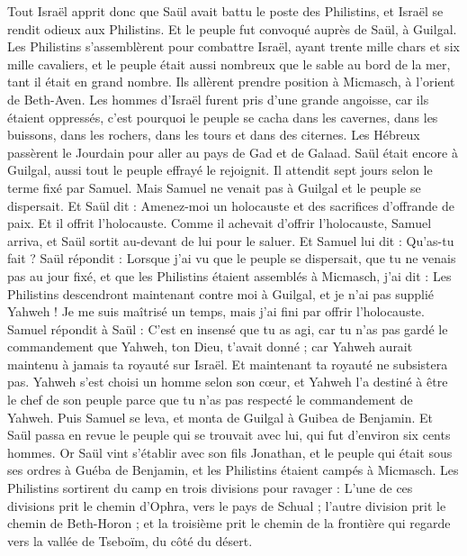 \begin{multicols}{2}
Tout Israël apprit donc que Saül avait battu le poste des Philistins, et Israël se rendit odieux aux Philistins. Et le peuple fut convoqué auprès de Saül, à Guilgal.
Les Philistins s'assemblèrent pour combattre Israël, ayant trente mille chars et six mille cavaliers, et le peuple était aussi nombreux que le sable au bord de la mer, tant il était en grand nombre. Ils allèrent prendre position à Micmasch, à l'orient de Beth-Aven.
Les hommes d'Israël furent pris d'une grande angoisse, car ils étaient oppressés, c'est pourquoi le peuple se cacha dans les cavernes, dans les buissons, dans les rochers, dans les tours et dans des citernes.
Les Hébreux passèrent le Jourdain pour aller au pays de Gad et de Galaad. Saül était encore à Guilgal, aussi tout le peuple effrayé le rejoignit.
Il attendit sept jours selon le terme fixé par Samuel. Mais Samuel ne venait pas à Guilgal et le peuple se dispersait.
Et Saül dit : Amenez-moi un holocauste et des sacrifices d'offrande de paix. Et il offrit l'holocauste.
Comme il achevait d'offrir l'holocauste, Samuel arriva, et Saül sortit au-devant de lui pour le saluer.
Et Samuel lui dit : Qu'as-tu fait ? Saül répondit : Lorsque j'ai vu que le peuple se dispersait, que tu ne venais pas au jour fixé, et que les Philistins étaient assemblés à Micmasch,
j'ai dit : Les Philistins descendront maintenant contre moi à Guilgal, et je n'ai pas supplié Yahweh ! Je me suis maîtrisé un temps, mais j'ai fini par offrir l'holocauste.
Samuel répondit à Saül : C'est en insensé que tu as agi, car tu n'as pas gardé le commandement que Yahweh, ton Dieu, t'avait donné ; car Yahweh aurait maintenu à jamais ta royauté sur Israël.
Et maintenant ta royauté ne subsistera pas. Yahweh s'est choisi un homme selon son cœur, et Yahweh l'a destiné à être le chef de son peuple parce que tu n'as pas respecté le commandement de Yahweh.
Puis Samuel se leva, et monta de Guilgal à Guibea de Benjamin. Et Saül passa en revue le peuple qui se trouvait avec lui, qui fut d'environ six cents hommes.
Or Saül vint s'établir avec son fils Jonathan, et le peuple qui était sous ses ordres à Guéba de Benjamin, et les Philistins étaient campés à Micmasch.
Les Philistins sortirent du camp en trois divisions pour ravager : L'une de ces divisions prit le chemin d'Ophra, vers le pays de Schual ;
l'autre division prit le chemin de Beth-Horon ; et la troisième prit le chemin de la frontière qui regarde vers la vallée de Tseboïm, du côté du désert.

\end{multicols}
